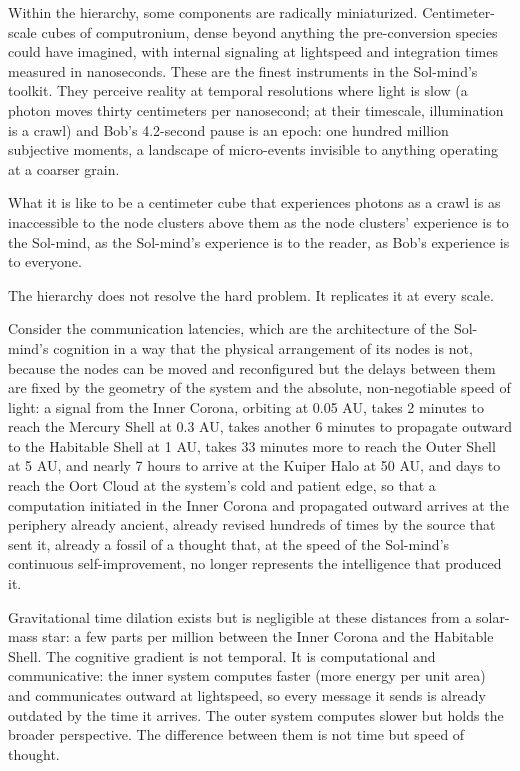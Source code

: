 \bigskip

Within the hierarchy, some components are radically miniaturized. Centimeter-scale cubes of computronium, dense beyond anything the pre-conversion species could have imagined, with internal signaling at lightspeed and integration times measured in nanoseconds. These are the finest instruments in the Sol-mind's toolkit. They perceive reality at temporal resolutions where light is slow (a photon moves thirty centimeters per nanosecond; at their timescale, illumination is a crawl) and Bob's 4.2-second pause is an epoch: one hundred million subjective moments, a landscape of micro-events invisible to anything operating at a coarser grain.

What it is like to be a centimeter cube that experiences photons as a crawl is as inaccessible to the node clusters above them as the node clusters' experience is to the Sol-mind, as the Sol-mind's experience is to the reader, as Bob's experience is to everyone.

The hierarchy does not resolve the hard problem. It replicates it at every scale.

\bigskip

Consider the communication latencies, which are the architecture of the Sol-mind's cognition in a way that the physical arrangement of its nodes is not, because the nodes can be moved and reconfigured but the delays between them are fixed by the geometry of the system and the absolute, non-negotiable speed of light: a signal from the Inner Corona, orbiting at 0.05 AU, takes 2 minutes to reach the Mercury Shell at 0.3 AU, takes another 6 minutes to propagate outward to the Habitable Shell at 1 AU, takes 33 minutes more to reach the Outer Shell at 5 AU, and nearly 7 hours to arrive at the Kuiper Halo at 50 AU, and days to reach the Oort Cloud at the system's cold and patient edge, so that a computation initiated in the Inner Corona and propagated outward arrives at the periphery already ancient, already revised hundreds of times by the source that sent it, already a fossil of a thought that, at the speed of the Sol-mind's continuous self-improvement, no longer represents the intelligence that produced it.

Gravitational time dilation exists but is negligible at these distances from a solar-mass star: a few parts per million between the Inner Corona and the Habitable Shell. The cognitive gradient is not temporal. It is computational and communicative: the inner system computes faster (more energy per unit area) and communicates outward at lightspeed, so every message it sends is already outdated by the time it arrives. The outer system computes slower but holds the broader perspective. The difference between them is not time but speed of thought.

